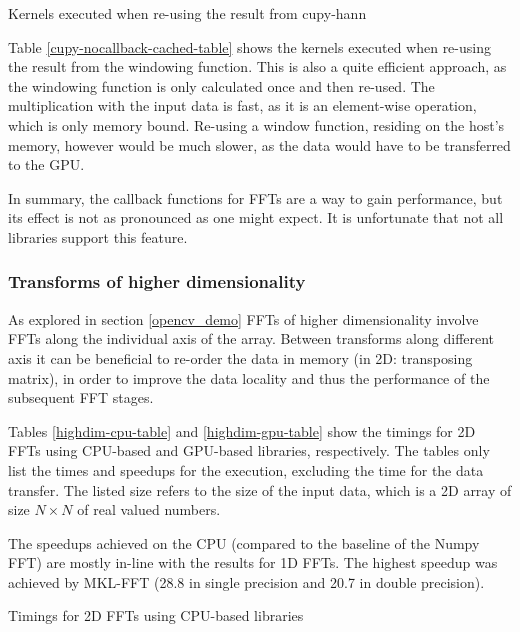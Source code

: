 \documentclass[english,11pt,a4paper,table]{article} %
\begin{document}
\begin{table}[H]
	\centering
	\begin{scriptsize}
	
	\end{scriptsize}
	\caption{Kernels executed when re-using the result from cupy-hann}
	\label{cupy-nocallback-cached-table}
\end{table}

Table \ref{cupy-nocallback-cached-table} shows the kernels executed when re-using the result from the windowing function. This is also a quite efficient approach, as the windowing function is only calculated once and then re-used.
The multiplication with the input data is fast, as it is an element-wise operation, which is only memory bound.
Re-using a window function, residing on the host's memory, however would be much slower, as the data would have to be transferred to the GPU.

In summary, the callback functions for FFTs are a way to gain performance, but its effect is not as pronounced as one might expect.
It is unfortunate that not all libraries support this feature.

\subsubsection{Transforms of higher dimensionality}

As explored in section \ref{opencv_demo} FFTs of higher dimensionality involve FFTs along the individual axis of the array.
Between transforms along different axis it can be beneficial to re-order the data in memory (in 2D: transposing matrix), in order to improve the data locality and thus the performance of the subsequent FFT stages.

Tables \ref{highdim-cpu-table} and \ref{highdim-gpu-table} show the timings for 2D FFTs using CPU-based and GPU-based libraries, respectively.
The tables only list the times and speedups for the execution, excluding the time for the data transfer.
The listed size refers to the size of the input data, which is a 2D array of size $N \times N$ of real valued numbers.

The speedups achieved on the CPU (compared to the baseline of the Numpy FFT) are mostly in-line with the results for 1D FFTs.
The highest speedup was achieved by MKL-FFT (28.8 in single precision and 20.7 in double precision).

\begin{table}[H]
	\centering
	\begin{footnotesize}
	
	\end{footnotesize}
	\caption{Timings for 2D FFTs using CPU-based libraries}
	\label{highdim-cpu-table}
\end{table}
\end{document}
